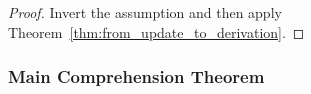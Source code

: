 \begin{proof}
Invert the assumption and then apply Theorem~\ref{thm:from_update_to_derivation}.
\end{proof}

\subsubsection{Main Comprehension Theorem}
